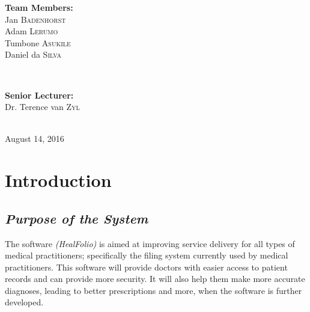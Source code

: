 \documentclass[a4paper]{article}
\begin{document}
\begin{titlepage}
\begin{minipage}{0.4\textwidth}
\begin{flushleft}
\textbf{Team Members:} \\[0.3cm]

Jan \textsc{Badenhorst} \\
Adam \textsc{Lerumo} \\
Tumbone \textsc{Asukile} \\
Daniel da \textsc{Silva} \\

\end{flushleft}

\end{minipage} \\[0.7cm]

\begin{minipage}{0.4\textwidth}

\begin{flushright} \large

\textbf{Senior Lecturer:} \\[0.3cm]

Dr. Terence van \textsc{Zyl} \\

\end{flushright}

\end{minipage} \\[1cm]

{\large August 14, 2016} 
    
\end{titlepage}

\setlength\parindent{24pt}

\newpage

\tableofcontents

\newpage

\section{Introduction}

\subsection{\textit{Purpose of the System}}

The software \emph{(HealFolio)} is aimed at improving service delivery for all types of medical practitioners; specifically the filing system currently used by medical practitioners. This software will provide doctors with easier access to patient records and can provide more security. It will also help them make more accurate diagnoses, leading to better prescriptions and more, when the software is further developed. 
		
\end{document}
